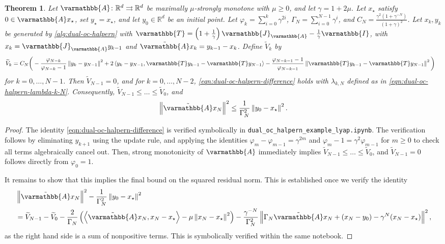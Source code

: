 \documentclass{article}
\theoremstyle{definition}
\theoremstyle{plain}
\newtheorem{theorem}{Theorem}
\newcommand{\reals}{\mathbb{R}}
\newcommand{\opA}{{\varmathbb{A}}}
\newcommand{\opI}{{\varmathbb{I}}}
\newcommand{\opJ}{{\varmathbb{J}}}
\newcommand{\opT}{{\varmathbb{T}}}
\newcommand{\inprod}[2]{\left\langle #1,#2 \right\rangle}
\newcommand{\sqnorm}[1]{\left\| #1 \right\|^2}
\newcommand{\topa}{\tilde{\opA}}
\begin{document}
\begin{theorem} \label{theorem:dual-oc-halpern}
Let $\opA\colon\reals^d\rightrightarrows\reals^d$ be maximally $\mu$-strongly monotone with $\mu\ge 0$, and let $\gamma=1+2\mu$.
Let $x_\star$ satisfy $0 \in \opA x_\star$, set $y_\star=x_\star$, and let $y_0\in\reals^d$ be an initial point.
Let \(\varphi_k=\sum_{i=0}^{k}\gamma^{2i}\), \(\Gamma_N=\sum_{i=0}^{N-1}\gamma^i\), and \(C_N=\frac{\gamma^2(1+\gamma^{-N})}{(1+\gamma)^2}\).
Let $x_k,y_k$ be generated by \eqref{alg:dual-oc-halpern} with $\opT = \left(1 + \frac{1}{\gamma}\right) \opJ_\opA - \frac{1}{\gamma} \opI$, with $x_k=\opJ_\opA y_{k-1}$ and $\topa x_k=y_{k-1}-x_k$.
Define $\widetilde V_k$ by
\begin{align}
\label{eqn:dual-oc-halpern-lyapunov}
    \widetilde V_k = 
    C_N\bigg(
    &-\frac{\varphi_{N-k}}{\varphi_{N-k}-1}\sqnorm{y_k-y_{N-1}}
    +2\inprod{y_k-y_{N-1}}{\opT y_{k-1}-\opT y_{N-1}}
    -\frac{\varphi_{N-k-1}-1}{\varphi_{N-k-1}}
    \sqnorm{\opT y_{k-1}-\opT y_{N-1}}
    \bigg)
\end{align}
for $k=0,\dots,N-1$.
Then \(\widetilde V_{N-1}=0\), and for \(k=0,\dots,N-2\), \eqref{eqn:dual-oc-halpern-difference} holds with $\lambda_{k,N}$ defined as in \eqref{eqn:dual-oc-halpern-lambda-k-N}.
Consequently, \(\widetilde V_{N-1}\le\dots\le\widetilde V_0\), and
\[
    \sqnorm{\topa x_N}\le \frac{1}{\Gamma_N^2}\sqnorm{y_0-x_\star}.
\]
\end{theorem}

\begin{proof}
The identity \eqref{eqn:dual-oc-halpern-difference} is verified symbolically in 
\texttt{dual\_oc\_halpern\_example\_lyap.ipynb}.
The verification follows by eliminating \(y_{k+1}\) using the update rule, and applying the identities 
\(\varphi_m-\varphi_{m-1}=\gamma^{2m}\) and \(\varphi_m-1=\gamma^2\varphi_{m-1}\) for $m\ge 0$ to check all terms algebraically cancel out.
Then, strong monotonicity of \(\opA\) immediately implies \(\widetilde V_{N-1} \le \dots \le \widetilde V_0\), and \(\widetilde V_{N-1}=0\) follows directly from \(\varphi_0=1\).

It remains to show that this implies the final bound on the squared residual norm.
This is established once we verify the identity
\begin{align*}
    & \sqnorm{\topa x_N} - \frac{1}{\Gamma_N^2}\sqnorm{y_0-x_\star} \\
    & = \widetilde V_{N-1} - \widetilde V_0 - \frac{2}{\Gamma_N}
    \left( \inprod{\topa x_N}{x_N-x_\star} - \mu\sqnorm{x_N-x_\star} \right) 
    - \frac{\gamma^{-N}}{\Gamma_N^2} \sqnorm{\Gamma_N\topa x_N+(x_N-y_0)-\gamma^N(x_N-x_\star)} ,
\end{align*}
as the right hand side is a sum of nonpositive terms.
This is symbolically verified within the same notebook.
\end{proof}
\end{document}
